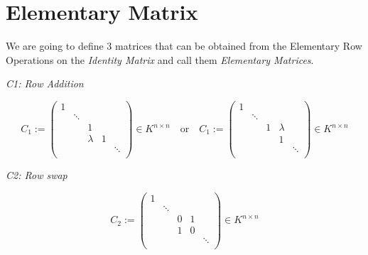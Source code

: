 \newpage
\section{Elementary Matrix}

We are going to define 3 matrices that can be obtained from the Elementary Row
Operations on the \emph{Identity Matrix} and call them \emph{Elementary Matrices}.
\vspace{\baselineskip}

\emph{C1: Row Addition}

\[
       C_1 := 
       \begin{pmatrix}
       1      &        &        &        &        \\
              & \ddots &        &        &        \\
              &        & 1      &        &        \\
              &        & \lambda & 1     &        \\
              &        &        &        & \ddots \\
       \end{pmatrix}
       \in K^{n \times n}
       \quad \text{or} \quad
       C_1 := 
       \begin{pmatrix}
       1      &        &        &        &        \\
              & \ddots &        &        &        \\
              &        & 1      & \lambda &        \\
              &        &        & 1      &        \\
              &        &        &        & \ddots \\
       \end{pmatrix}
       \in K^{n \times n}
\]


\emph{C2: Row swap}

\[
       C_2 := 
       \begin{pmatrix}
       1      &        &        &        &        \\
              & \ddots &        &        &        \\
              &        & 0      & 1      &        \\
              &        & 1      & 0      &        \\
              &        &        &        & \ddots \\
       \end{pmatrix}
       \in K^{n \times n}
\]


